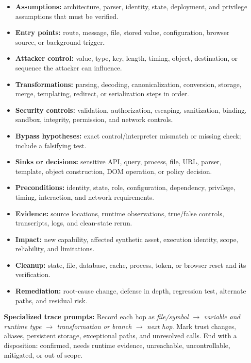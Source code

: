 \documentclass[11pt]{article}
\begin{document}
\newcommand{\analysisrecord}{%
\begin{itemize}
  \item \textbf{Assumptions:} architecture, parser, identity, state, deployment, and privilege assumptions that must be verified.
  \item \textbf{Entry points:} route, message, file, stored value, configuration, browser source, or background trigger.
  \item \textbf{Attacker control:} value, type, key, length, timing, object, destination, or sequence the attacker can influence.
  \item \textbf{Transformations:} parsing, decoding, canonicalization, conversion, storage, merge, templating, redirect, or serialization steps in order.
  \item \textbf{Security controls:} validation, authorization, escaping, sanitization, binding, sandbox, integrity, permission, and network controls.
  \item \textbf{Bypass hypotheses:} exact control/interpreter mismatch or missing check; include a falsifying test.
  \item \textbf{Sinks or decisions:} sensitive API, query, process, file, URL, parser, template, object construction, DOM operation, or policy decision.
  \item \textbf{Preconditions:} identity, state, role, configuration, dependency, privilege, timing, interaction, and network requirements.
  \item \textbf{Evidence:} source locations, runtime observations, true/false controls, transcripts, logs, and clean-state rerun.
  \item \textbf{Impact:} new capability, affected synthetic asset, execution identity, scope, reliability, and limitations.
  \item \textbf{Cleanup:} state, file, database, cache, process, token, or browser reset and its verification.
  \item \textbf{Remediation:} root-cause change, defense in depth, regression test, alternate paths, and residual risk.
\end{itemize}}

\begin{tcolorbox}[breakable,title=Template 1 --- Source-to-sink trace,colback=Mist,colframe=Teal]
\analysisrecord
\textbf{Specialized trace prompts:} Record each hop as
\emph{file/symbol $\rightarrow$ variable and runtime type $\rightarrow$
transformation or branch $\rightarrow$ next hop}. Mark trust changes, aliases,
persistent storage, exceptional paths, and unresolved calls. End with a disposition:
confirmed, needs runtime evidence, unreachable, uncontrollable, mitigated, or
out of scope.
\end{tcolorbox}
\end{document}
